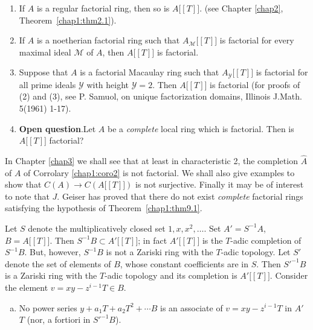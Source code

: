 \begin{remark*} %
\begin{enumerate}[1.]
\item If $A$ is a regular factorial ring, then so is $A
  \big[[T]\big]$. (see Chapter \ref{chap2}, Theorem~\ref{chap1:thm2.1}).  

\item If $A$ is a noetherian factorial ring such that $A_{\mathscr{M}}
  \big[[T]\big]$ is factorial for every maximal ideal $\mathscr{M}$
  of $A$, then $A \big[[T]\big]$ is factorial.  

\item Suppose that $A$ is a factorial Macaulay ring such that
  $A_\mathscr{Y} \big[[T]\big]$ is  factorial for all prime ideals
  $\mathscr{Y}$ with height $\mathscr{Y} = 2$. Then $A \big[[T]\big]$ is
  factorial (for proofs of (2) and (3), see P. Samuol, on unique
  factorization domains, Illinois J.Math. 5(1961) 1-17). 

\item \textbf{Open question}.\pageoriginale Let $A$ be a
  \textit{complete} local ring which is factorial. Then is $A \big [
    [T] \big]$ factorial?  
\end{enumerate}
  \end{remark*}  
  
  In Chapter \ref{chap3} we shall see that at least in characteristic 2,
  the completion $\hat{A}$ of $A$ of Corrolary \ref{chap1:coro2} is not
  factorial. We shall also give examples to show that $C(A)
  \rightarrow C(A \big [[T]\big])$ is not surjective. Finally it may
  be of interest to note that $J$. Geiser has proved that there do not
  exist \textit{complete} factorial rings satisfying the hypothesis of
  Theorem~\ref{chap1:thm9.1}. 

\begin{proofofthm} %
Let $S$ denote the multiplicatively closed set $1, x, x^2,
\ldots$. Set $A' = S^{-1} A$, $B = A \big[[T]\big]$. Then $S^{-1} B
\subset A' \big[[T]\big]$; in fact $A' \big[[T]\big]$ is the
$T$-adic completion of $S^{-1} B$. But, however, $S^{-1}B$ is not a
Zariski ring with the $T$-adic topology. Let $S'$ denote the set of
elements of $B$, whose constant coefficients are in $S$. Then
$S'^{-1}B$ is a Zariski ring with the $T$-adic topology and its
completion is $A' \big[[T]\big]$. Consider the element $v = xy - z^{i
  - 1} T \in B$. 
\begin{enumerate}[(a)]
\item No power series $y + a_1 T + a_2 T^2 + \cdots B$ is an associate
  of $v = xy - z^{i - 1} T $ in $A'$   $T$ (nor, a fortiori in
  $S'^{-1} B$).  
\end{enumerate}
\end{proofofthm} 

